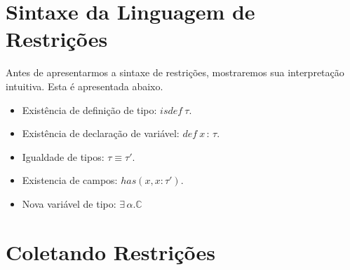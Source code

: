 \documentclass[a4paper,8pt]{article}
\begin{document}
     \section{Sintaxe da Linguagem de Restrições}\label{constraintsyn}

     Antes de apresentarmos a sintaxe de restrições, mostraremos sua
     interpretação intuitiva. Esta é apresentada abaixo.

       \begin{itemize}
           \item Existência de definição de tipo: $isdef\:\tau$.
           \item Existência de declaração de variável: $def\:x\,:\,\tau$.
           \item Igualdade de tipos: $\tau \equiv \tau'$.
	   \item Existencia de campos: $has(x,x:\tau')$.
           \item Nova variável de tipo: $\exists \,\alpha. \mathbb{C}$
       \end{itemize}

      
     \section{Coletando Restrições}\label{constrcollect}
\end{document}
